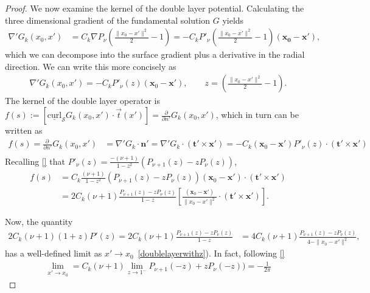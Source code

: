 \documentclass[final]{siamltex}
\newcommand{\C}{C_k}
\renewcommand{\S} {\mathcal{S}}
\begin{document}
\begin{proof}
We now examine the kernel of the double layer potential. Calculating the three dimensional gradient of the fundamental solution $G$
yields
\begin{align*}
  \nabla' G_k(x_0,x') &= \C \nabla P_\nu\left(
    \frac{\|x_0-x'\|^2}{2}-1\right) = 
  -\C P'_\nu\left(\frac{\|x_0-x'\|^2}{2}-1\right)
    (\mathbf{x_0}-\mathbf{x'}),
\end{align*}
which we can decompose into the surface gradient plus a derivative in
the radial direction. We can write this more concisely as
\begin{align*}
\nabla' G_k(x_0,x')=-\C P'_{\nu}(z) (\mathbf{x}_0-\mathbf{x'}), \qquad 
  z=\left(\frac{\|{ x_0}-{x}'\|^2}{2}-1\right).
\end{align*} The kernel of the double layer operator is   $f(s):=[\underline{\mbox{curl}}_{\S}G_{k}(x_{0},x') \cdot
\vec{t}(x')]= \frac{\partial}{\partial n'}
G_k({x_0},{x}')$, which in turn can be written as 
\begin{align}
 f(s)=\frac{\partial \, }{\partial n'} G_k({ x}_0,{ x}') &
 =\nabla' G_k \cdot {\mathbf n}' = \nabla' G_k\cdot \left( \mathbf{t}'
 \times {\mathbf x}' \right) 
 =-\C (\mathbf{x}_0-\mathbf{x'})P'_{\nu}(z)\cdot \left(
 \mathbf{t}' \times {\mathbf x}' \right) \nonumber\\
 \end{align}
 Recalling \eqref{} that 
 $P'_{\nu}(z)=\frac{-(\nu+1)}{1-z^2}(P_{\nu+1}(z)-z P_{\nu}(z))$,
 \begin{align}
  f(s)
  &=\C \frac{(\nu+1)}{1-z^2}\left(P_{\nu+1}(z)-zP_{\nu}(z)\right)  (\mathbf{x}_0-\mathbf{x'})\cdot \left(
   \mathbf{t}' \times {\mathbf x}' \right) \nonumber\\
 &= 2\C(\nu+1)\frac{P_{\nu+1}(z)-zP_{\nu}(z)}{1-z} \left[
 \frac{(\mathbf{x}_0-\mathbf{x'})}{\|{x}_0-{x'}\|^2}\cdot
 \left( \mathbf{t}' \times {\mathbf x}' \right)\right].
 \label{kern1}
\end{align} 

Now, the quantity
\begin{align}\label{nicepartoflimit}
2\C(\nu+1)(1+z)P'(z)=2\C(\nu+1)\frac{P_{\nu+1}(z)-zP_{\nu}(z)}{1-z}&=4\C(\nu+1)\frac{P_{\nu+1}(z)-zP_{\nu}(z)}{4-\|{x_0}-{x'}\|^2},
\end{align}
has a well-defined limit as $x'\rightarrow
x_0$~\eqref{doublelayerwithz}). In fact, following \eqref{}
\begin{align*}
\lim_{x'\rightarrow x_0}=\C(\nu+1)\lim_{z\rightarrow 1^-}P_{\nu+1}(-z)+zP_{\nu}(-z))=-\frac{1}{2\pi}
\end{align*}


\end{proof}
\end{document}
